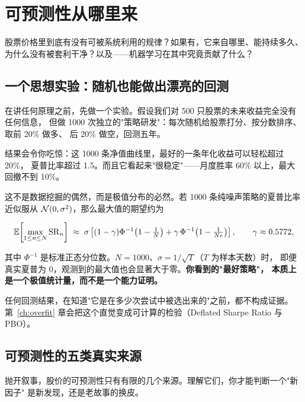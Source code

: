 \chapter{可预测性从哪里来}\label{ch:source}

\begin{keybox}[本章要回答的问题]
股票价格里到底有没有可被系统利用的规律？如果有，它来自哪里、能持续多久、
为什么没有被套利干净？以及——机器学习在其中究竟贡献了什么？
\end{keybox}

\section{一个思想实验：随机也能做出漂亮的回测}

在讲任何原理之前，先做一个实验。假设我们对 500 只股票的未来收益完全没有任何信息，
但做 1000 次独立的"策略研发"：每次随机给股票打分、按分数排序、取前 20\% 做多、
后 20\% 做空，回测五年。

结果会令你吃惊：这 1000 条净值曲线里，最好的一条年化收益可以轻松超过 20\%，
夏普比率超过 1.5。而且它看起来"很稳定"——月度胜率 60\% 以上，最大回撤不到 10\%。

这不是数据挖掘的偶然，而是极值分布的必然。若 1000 条纯噪声策略的夏普比率近似服从
$\mathcal{N}(0, \sigma^2)$，那么最大值的期望约为

\begin{equation}
  \mathbb{E}\!\left[\max_{1\le n\le N} \mathrm{SR}_n\right]
  \;\approx\; \sigma\left[(1-\gamma)\Phi^{-1}\!\left(1-\tfrac1N\right)
  + \gamma\,\Phi^{-1}\!\left(1-\tfrac{1}{Ne}\right)\right],
  \qquad \gamma \approx 0.5772,
  \label{eq:emax}
\end{equation}

其中 $\Phi^{-1}$ 是标准正态分位数。$N=1000$、$\sigma=1/\sqrt{T}$（$T$ 为样本天数）时，
即便真实夏普为 $0$，观测到的最大值也会显著大于零。\textbf{你看到的"最好策略"，
本质上是一个极值统计量，而不是一个能力证明。}

\begin{warnbox}[本书的第一个纪律]
任何回测结果，在知道"它是在多少次尝试中被选出来的"之前，都不构成证据。
第~\ref{ch:overfit} 章会把这个直觉变成可计算的检验（Deflated Sharpe Ratio 与 PBO）。
\end{warnbox}

\section{可预测性的五类真实来源}

抛开叙事，股价的可预测性只有有限的几个来源。理解它们，你才能判断一个"新因子"
是新发现，还是老故事的换皮。

